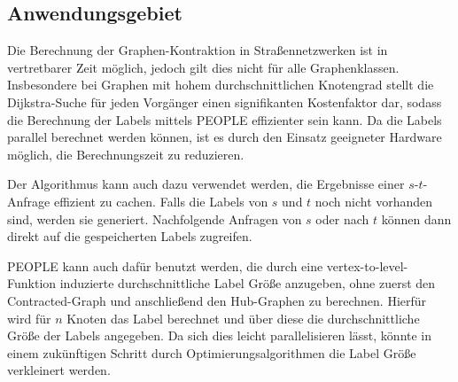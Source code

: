 \subsection{Anwendungsgebiet}

Die Berechnung der Graphen-Kontraktion in Straßennetzwerken ist in vertretbarer Zeit möglich, jedoch gilt dies nicht für alle Graphenklassen. Insbesondere bei Graphen mit hohem durchschnittlichen Knotengrad stellt die Dijkstra-Suche für jeden Vorgänger einen signifikanten Kostenfaktor dar, sodass die Berechnung der Labels mittels PEOPLE effizienter sein kann.
Da die Labels parallel berechnet werden können, ist es durch den Einsatz geeigneter Hardware möglich, die Berechnungszeit zu reduzieren.

Der Algorithmus kann auch dazu verwendet werden, die Ergebnisse einer $s$-$t$-Anfrage effizient zu cachen.
Falls die Labels von $s$ und $t$ noch nicht vorhanden sind, werden sie generiert.
Nachfolgende Anfragen von $s$ oder nach $t$ können dann direkt auf die gespeicherten Labels zugreifen.

PEOPLE kann auch dafür benutzt werden, die durch eine vertex-to-level-Funktion induzierte durchschnittliche Label Größe anzugeben, ohne zuerst den Contracted-Graph und anschließend den Hub-Graphen zu berechnen.
Hierfür wird für $n$ Knoten das Label berechnet und über diese die durchschnittliche Größe der Labels angegeben.
Da sich dies leicht parallelisieren lässt, könnte in einem zukünftigen Schritt durch Optimierungsalgorithmen die Label Größe verkleinert werden.